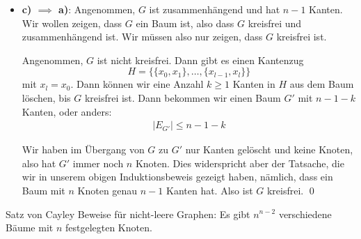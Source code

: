\documentclass[12pt]{article}
\begin{document}
\begin{itemize}
    Angenommen, $G$ ist nicht zusammenhängend. Dann gibt es Knoten $a, b \in V$, sodass es keine Kantenzüge von $a$ nach $b$ gibt. Es gibt also $k$ verschiedene zusammenhängende Teilgraphen von $G$:
    
    \begin{align*}
        \exists \{G_1,\dots,G_k\}\quad \text{mit} \ G_i \subset G \ \text{ und }\ G_i \text{ zusammenhängend }\forall i = 1,\dots,k
    \end{align*}

    Da $G$ kreisfrei ist, ist jedes $G_i$ auch kreisfrei. Somit ist jedes $G_i$ ein Baum. Sei $n_i$ die Anzahl Knoten im Teilgraph $G_i$. Dann gilt nach obigem Induktionsbeweis: $|E_{G_i}| = n_i - 1$. Wir haben dann aber
    \begin{align*}
        \sum_{i = 1}^{k} |E_{G_i}| = \sum_{i = 1}^{k} \left(n_i - 1\right) = \left(\sum_{i = 1}^{k} n_i\right) - \left(\sum_{i = 1}^{k} 1\right) = n - k
    \end{align*}

    Da $G$ nicht zusammenhängend ist, gilt $k \geq 2$. Dann ist $|E_G| \leq n - 2$. Dies widerspricht aber der Annahme, dass $G$ genau $n - 1$ Kanten besitzt. Also ist $G$ zusammenhängend.

    \item \textbf{c) $\implies$ a)}: Angenommen, $G$ ist zusammenhängend und hat $n-1$ Kanten. Wir wollen zeigen, dass $G$ ein Baum ist, also dass $G$ kreisfrei und zusammenhängend ist. Wir müssen also nur zeigen, dass $G$ kreisfrei ist.
    
    Angenommen, $G$ ist nicht kreisfrei. Dann gibt es einen Kantenzug 
    \[ H = \{\{x_0, x_1\}, \dots, \{x_{l-1}, x_l\}\} \]
    mit $x_l = x_0$. Dann können wir eine Anzahl $k \geq 1$ Kanten in $H$ aus dem Baum löschen, bis $G$ kreisfrei ist. Dann bekommen wir einen Baum $G'$ mit $n - 1 - k$ Kanten, oder anders:
    \begin{align*}
        |E_{G'}| \leq n - 1 - k
    \end{align*}

    Wir haben im Übergang von $G$ zu $G'$ nur Kanten gelöscht und keine Knoten, also hat $G'$ immer noch $n$ Knoten. Dies widerspricht aber der Tatsache, die wir in unserem obigen Induktionsbeweis gezeigt haben, nämlich, dass ein Baum mit $n$ Knoten genau $n - 1$ Kanten hat. Also ist $G$ kreisfrei. \qed
\end{itemize}

\begin{problem}{Satz von Cayley}{}
    Beweise für nicht-leere Graphen: Es gibt $n^{n-2}$ verschiedene Bäume mit $n$ festgelegten Knoten. 
\end{problem}
\end{document}
